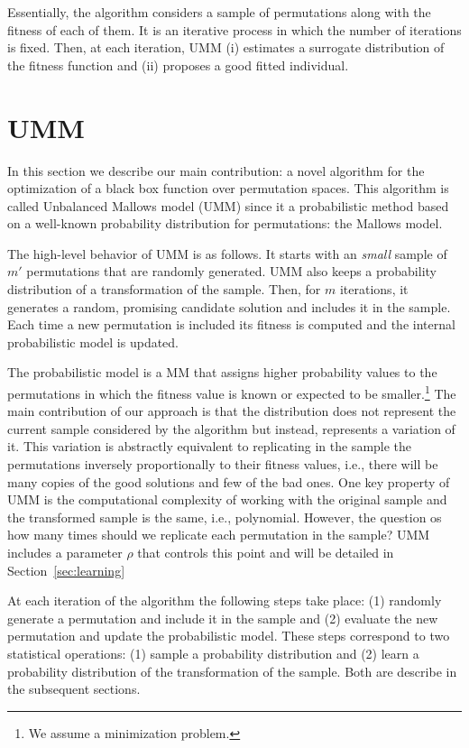 \documentclass[runningheads]{llncs}
\begin{document}
Essentially, the algorithm  considers a sample of permutations along with the fitness of each of them. It is an iterative process in which the number of iterations is fixed. 
Then, at each iteration, UMM (i) estimates a surrogate distribution of the fitness function and (ii) proposes a good fitted individual. 


\section{UMM }
In this section we describe our main contribution: a novel algorithm for the optimization of a black box function over permutation spaces. This algorithm is called Unbalanced Mallows model (UMM) since it a probabilistic method based on a well-known probability distribution for permutations: the Mallows model. 


The high-level behavior of UMM is as follows. It starts with an \textit{small} sample of $m'$ permutations that are randomly generated. UMM also keeps a probability distribution of a transformation of the sample. Then, for $m$ iterations, it generates a random, promising candidate solution and includes it in the sample. Each time a new permutation is included its fitness is computed and the internal probabilistic model is updated. 

The probabilistic model is a MM that assigns higher probability values to the permutations in which the fitness value is known or expected to be smaller.\footnote{We assume a minimization problem.} The main contribution of our approach is that the distribution does not represent the current sample considered by the algorithm but instead, represents a variation of it. This variation is abstractly equivalent to replicating in the sample the permutations inversely proportionally to their fitness values, i.e., there will be many copies of the good solutions and few of the bad ones. One key property of UMM is the computational complexity of working with the original sample and the transformed sample is the same, i.e., polynomial. However, the question os how many times should we replicate each permutation in the sample? UMM includes a parameter $\rho$ that controls this point and will be detailed in Section~\ref{sec:learning}

At each iteration of the algorithm the following steps take place: (1) randomly generate a permutation and include it in the sample and (2) evaluate the new permutation and update the probabilistic model. These steps correspond to two statistical operations: (1) sample a probability distribution and (2) learn a probability distribution of the transformation of the sample. Both are describe in the subsequent sections. 
\end{document}
